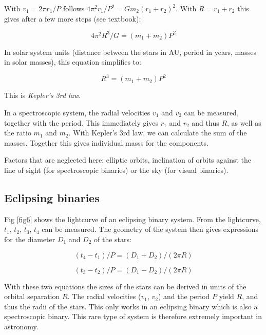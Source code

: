 With $v_1 = 2 \pi r_1 / P$ follows $4 \pi^2 r_1 / P^2 = G m_2 (r_1 + r_2)^2$. With $R = r_1 + r_2$ this gives after a few more steps (see textbook):

\begin{equation}
4 \pi^2 R^3 / G = (m_1 + m_2) P^2
\label{eq11}
\end{equation}

In solar system units (distance between the stars in AU, period in years, masses in solar masses), this equation simplifies to:

\begin{equation}
R^3 = (m_1 + m_2) P^2
\label{eq12}
\end{equation}

This is \textit{Kepler's 3rd law}. 

In a spectroscopic system, the radial velocities $v_1$ and $v_2$ can be measured, together with the period. This immediately gives $r_1$ and $r_2$ and thus $R$, as well as the ratio $m_1$ and $m_2$. With Kepler's 3rd law, we can calculate the sum of the masses. Together this gives individual masss for the components. 

Factors that are neglected here: elliptic orbits, inclination of orbits against the line of sight (for spectroscopic binaries) or the sky (for visual binaries). 

\subsection{Eclipsing binaries}

Fig \ref{fig6} shows the lightcurve of an eclipsing binary system. From the lightcurve, $t_1$, $t_2$, $t_3$, $t_4$ can be measured. The geometry of the system then gives expressions for the diameter $D_1$ and $D_2$ of the stars:

\begin{equation}
(t_4 - t_1) / P = (D_1 + D_2) / (2 \pi R)
\label{eq13}
\end{equation}

\begin{equation}
(t_3 - t_2) / P = (D_1 - D_2) / (2 \pi R)
\label{e14}
\end{equation}

With these two equations the sizes of the stars can be derived in units of the orbital separation $R$. The radial velocities ($v_1$, $v_2$) and the period $P$ yield $R$, and thus the radii of the stars. This only works in an eclipsing binary which is also a spectroscopic binary. This rare type of system is therefore extremely important in astronomy.

